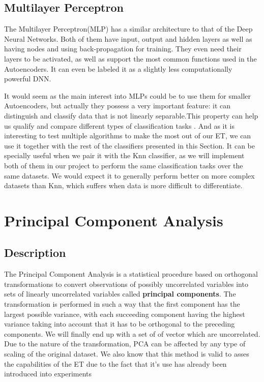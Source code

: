 \subsection{Multilayer Perceptron}

The Multilayer Perceptron(MLP) has a similar architecture to that of the Deep Neural Networks. Both of them have input, output and hidden layers as well as having nodes and using back-propagation for training. They even need their layers to be activated, as well as support the most common functions used in the Autoencoders. It can even be labeled it as a slightly less computationally powerful DNN. \par

It would seem as the main interest into MLPs could be to use them for smaller Autoencoders, but actually they possess a very important feature: it can distinguish and classify data that is not linearly separable.This property can help us qualify and compare different types of classification tasks \cite{MLP_classifier}. And as it is interesting to test multiple algorithms to make the most out of our ET, we can use it together with the rest of the classifiers presented in this Section. It can be specially useful when we pair it with the Knn classifier, as we will implement both of them in our project to perform the same classification tasks over the same datasets. We would expect it to generally perform better on more complex datasets than Knn, which suffers when data is more difficult to differentiate. \par

\section{Principal Component Analysis}
\subsection{Description}
The Principal Component Analysis is a statistical procedure based on orthogonal transformations to convert observations of possibly uncorrelated variables into sets of linearly uncorrelated variables called \textbf{principal components}. The transformation is performed in such a way that the first component has the largest possible variance, with each succeeding component having the highest variance taking into account that it has to be orthogonal to the preceding components. We will finally end up with a set of of vector which are uncorrelated. Due to the nature of the transformation, PCA can be affected by any type of scaling of the original dataset. We also know that this method is valid to asses the capabilities of the ET due to the fact that it's use has already been introduced into experiments \cite{val:pel:18c}  \par

